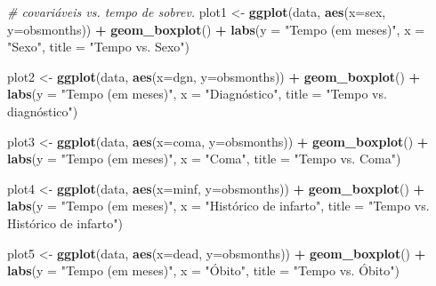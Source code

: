 \documentclass[]{article}
\newenvironment{Shaded}{\begin{snugshade}}{\end{snugshade}}
\newcommand{\KeywordTok}[1]{\textcolor[rgb]{0.13,0.29,0.53}{\textbf{#1}}}
\newcommand{\DataTypeTok}[1]{\textcolor[rgb]{0.13,0.29,0.53}{#1}}
\newcommand{\StringTok}[1]{\textcolor[rgb]{0.31,0.60,0.02}{#1}}
\newcommand{\CommentTok}[1]{\textcolor[rgb]{0.56,0.35,0.01}{\textit{#1}}}
\newcommand{\OperatorTok}[1]{\textcolor[rgb]{0.81,0.36,0.00}{\textbf{#1}}}
\newcommand{\NormalTok}[1]{#1}
\begin{document}
\begin{Shaded}
\begin{Highlighting}[]
{{\CommentTok{# covariáveis vs. tempo de sobrev.}
\NormalTok{plot1 <-}\StringTok{ }\KeywordTok{ggplot}\NormalTok{(data, }\KeywordTok{aes}\NormalTok{(}\DataTypeTok{x=}\NormalTok{sex, }\DataTypeTok{y=}\NormalTok{obsmonths)) }\OperatorTok{+}\StringTok{ }
\StringTok{  }\KeywordTok{geom_boxplot}\NormalTok{() }\OperatorTok{+}
\StringTok{  }\KeywordTok{labs}\NormalTok{(}\DataTypeTok{y =} \StringTok{"Tempo (em meses)"}\NormalTok{, }
       \DataTypeTok{x =} \StringTok{"Sexo"}\NormalTok{,}
       \DataTypeTok{title =} \StringTok{"Tempo vs. Sexo"}\NormalTok{) }

\NormalTok{plot2 <-}\StringTok{ }\KeywordTok{ggplot}\NormalTok{(data, }\KeywordTok{aes}\NormalTok{(}\DataTypeTok{x=}\NormalTok{dgn, }\DataTypeTok{y=}\NormalTok{obsmonths)) }\OperatorTok{+}\StringTok{ }
\StringTok{  }\KeywordTok{geom_boxplot}\NormalTok{() }\OperatorTok{+}\StringTok{ }
\StringTok{  }\KeywordTok{labs}\NormalTok{(}\DataTypeTok{y =} \StringTok{"Tempo (em meses)"}\NormalTok{, }
       \DataTypeTok{x =} \StringTok{"Diagnóstico",}
\StringTok{       title = "}\NormalTok{Tempo vs. diagnóstico") }

\NormalTok{plot3 <-}\StringTok{ }\KeywordTok{ggplot}\NormalTok{(data, }\KeywordTok{aes}\NormalTok{(}\DataTypeTok{x=}\NormalTok{coma, }\DataTypeTok{y=}\NormalTok{obsmonths)) }\OperatorTok{+}\StringTok{ }
\StringTok{  }\KeywordTok{geom_boxplot}\NormalTok{() }\OperatorTok{+}\StringTok{ }
\StringTok{  }\KeywordTok{labs}\NormalTok{(}\DataTypeTok{y =} \StringTok{"Tempo (em meses)"}\NormalTok{, }
       \DataTypeTok{x =} \StringTok{"Coma"}\NormalTok{,}
       \DataTypeTok{title =} \StringTok{"Tempo vs. Coma"}\NormalTok{) }

\NormalTok{plot4 <-}\StringTok{ }\KeywordTok{ggplot}\NormalTok{(data, }\KeywordTok{aes}\NormalTok{(}\DataTypeTok{x=}\NormalTok{minf, }\DataTypeTok{y=}\NormalTok{obsmonths)) }\OperatorTok{+}\StringTok{ }
\StringTok{  }\KeywordTok{geom_boxplot}\NormalTok{() }\OperatorTok{+}\StringTok{ }
\StringTok{  }\KeywordTok{labs}\NormalTok{(}\DataTypeTok{y =} \StringTok{"Tempo (em meses)"}\NormalTok{, }
       \DataTypeTok{x =} \StringTok{"Histórico de infarto"}\NormalTok{,}
       \DataTypeTok{title =} \StringTok{"Tempo vs. Histórico de infarto"}\NormalTok{) }

\NormalTok{plot5 <-}\StringTok{ }\KeywordTok{ggplot}\NormalTok{(data, }\KeywordTok{aes}\NormalTok{(}\DataTypeTok{x=}\NormalTok{dead, }\DataTypeTok{y=}\NormalTok{obsmonths)) }\OperatorTok{+}\StringTok{ }
\StringTok{  }\KeywordTok{geom_boxplot}\NormalTok{() }\OperatorTok{+}\StringTok{ }
\StringTok{  }\KeywordTok{labs}\NormalTok{(}\DataTypeTok{y =} \StringTok{"Tempo (em meses)"}\NormalTok{, }
       \DataTypeTok{x =} \StringTok{"Óbito"}\NormalTok{,}
       \DataTypeTok{title =} \StringTok{"Tempo vs. Óbito"}\NormalTok{) }

}}
\end{Highlighting}
\end{Shaded}
\end{document}
